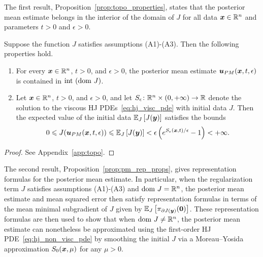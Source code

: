 The first result, Proposition~\ref{prop:topo_properties}, states that the posterior mean estimate belongs in the interior of the domain of $J$ for all data $\boldsymbol{x} \in \mathbb{R}^n$ and parameters $t>0$ and $\epsilon>0$.
\begin{prop} \label{prop:topo_properties}
Suppose the function $J$ satisfies assumptions (A1)-(A3). Then the following properties hold.
\begin{enumerate}
    \item[(i)] For every $\boldsymbol{x}\in\mathbb{R}^n$, $t>0$, and $\epsilon>0$, the posterior mean estimate $\boldsymbol{u}_{PM}(\boldsymbol{x},t,\epsilon)$ is contained in $\mathrm{int~}(\mathrm{dom~} J)$.
    
    \item[(ii)] Let $\boldsymbol{x}\in\mathbb{R}^n$, $t>0$, and $\epsilon>0$, and let $S_\epsilon\colon \mathbb{R}^n\times(0,+\infty) \to \mathbb{R}$ denote the solution to the viscous HJ PDEs~\eqref{eq:hj_visc_pde} with initial data $J$. Then the expected value of the initial data $\mathbb{E}_{J}\left [{J(\boldsymbol{y})}\right]$ satisfies the bounds
    \begin{equation}\label{eq:bounds_J}
    0 \leqslant J(\boldsymbol{u}_{PM}(\boldsymbol{x},t,\epsilon))\leqslant \mathbb{E}_{J}\left [{J(\boldsymbol{y})}\right] < \epsilon\left(e^{S_\epsilon(\boldsymbol{x},t)/\epsilon} - 1\right) < +\infty.
    \end{equation}
\end{enumerate}
\end{prop}
\begin{proof}
See Appendix~\ref{app:topo}.
\end{proof}

The second result, Proposition~\ref{prop:pm_rep_props}, gives representation formulas for the posterior mean estimate. In particular, when the regularization term $J$ satisfies assumptions (A1)-(A3) and $\mathrm{dom~} J = \mathbb{R}^n$, the posterior mean estimate and mean squared error then satisfy representation formulas in terms of the mean minimal subgradient of $J$ given by $\mathbb{E}_{J}\left [{\pi_{\partial J(\boldsymbol{y})}(\boldsymbol{0})}\right]$. These representation formulas are then used to show that when $\mathrm{dom~} J \neq \mathbb{R}^n$, the posterior mean estimate can nonetheless be approximated using the first-order HJ PDE~\eqref{eq:hj_non_visc_pde} by smoothing the initial $J$ via a Moreau--Yosida approximation $S_0(\boldsymbol{x},\mu)$ for any $\mu >0$.

